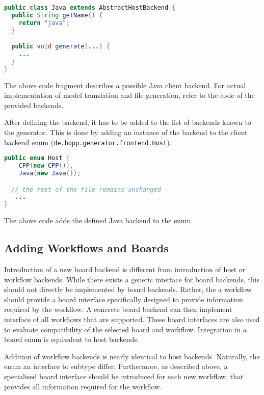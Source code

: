 \documentclass{report}
\begin{document}
\begin{lstlisting}[language=java]
public class Java extends AbstractHostBackend {
  public String getName() {
    return "java";
  }

  public void generate(...) {
    ...
  }
}
\end{lstlisting}

The above code fragment describes a possible Java client backend. For actual implementation of model translation and file generation, refer to the code of the provided backends.

After defining the backend, it has to be added to the list of backends known to the generator. This is done by adding an instance of the backend to the client backend enum (\texttt{de.hopp.generator.frontend.Host}).

\begin{lstlisting}[language=java]
public enum Host {
    CPP(new CPP()),
    Java(new Java());

  // the rest of the file remains unchanged
   ...
}
\end{lstlisting}

The above code adds the defined Java backend to the enum.

\subsection{Adding Workflows and Boards}

Introduction of a new board backend is different from introduction of host or workflow backends. While there exists a generic interface for board backends, this should not directly be implemented by board backends. Rather, the a workflow should provide a board interface specifically designed to provide information required by the workflow. A concrete board backend can then implement interface of all workflows that are supported. These board interfaces are also used to evaluate compatibility of the selected board and workflow. Integration in a board enum is equivalent to host backends.

Addition of workflow backends is nearly identical to host backends. Naturally, the enum an interface to subtype differ. Furthermore, as described above, a specialised board interface should be introduced for each new workflow, that provides all information required for the workflow. 
\end{document}
